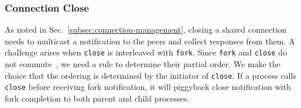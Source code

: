 \subsubsection{Connection Close}
\label{subsubsec:fork_close}
\quad



As noted in Sec.~\ref{subsec:connection-management}, closing a shared connection needs to multicast a notification to the peers and collect responses from them. A challenge arises when \texttt{close} is interleaved with \texttt{fork}. Since \texttt{fork} and \texttt{close} do not commute~\cite{clements2015scalable}, we need a rule to determine their partial order. We make the choice that the ordering is determined by the initiator of \texttt{close}. If a process calls \texttt{close} before receiving fork notification, it will piggyback close notification with fork completion to both parent and child processes.



